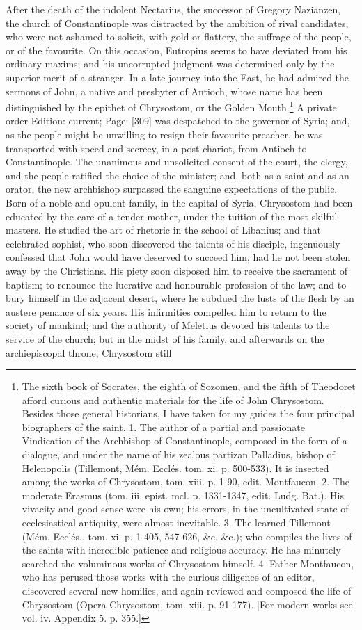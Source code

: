 After the death of the indolent Nectarius, the successor of Gregory Nazianzen, the church of Constantinople was distracted by the ambition of rival candidates, who were not ashamed to solicit, with gold or flattery, the suffrage of the people, or of the favourite. On this occasion, Eutropius seems to have deviated from his ordinary maxims; and his uncorrupted judgment was determined only by the superior merit of a stranger. In a late journey into the East, he had admired the sermons of John, a native and presbyter of Antioch, whose name has been distinguished by the epithet of Chrysostom, or the Golden Mouth.\footnote{The sixth book of Socrates, the eighth of Sozomen, and the fifth of Theodoret afford curious and authentic materials for the life of John Chrysostom. Besides those general historians, I have taken for my guides the four principal biographers of the saint. 1. The author of a partial and passionate Vindication of the Archbishop of Constantinople, composed in the form of a dialogue, and under the name of his zealous partizan Palladius, bishop of Helenopolis (Tillemont, Mém. Ecclés. tom. xi. p. 500-533). It is inserted among the works of Chrysostom, tom. xiii. p. 1-90, edit. Montfaucon. 2. The moderate Erasmus (tom. iii. epist. mcl. p. 1331-1347, edit. Ludg. Bat.). His vivacity and good sense were his own; his errors, in the uncultivated state of ecclesiastical antiquity, were almost inevitable. 3. The learned Tillemont (Mém. Ecclés., tom. xi. p. 1-405, 547-626, \&c. \&c.); who compiles the lives of the saints with incredible patience and religious accuracy. He has minutely searched the voluminous works of Chrysostom himself. 4. Father Montfaucon, who has perused those works with the curious diligence of an editor, discovered several new homilies, and again reviewed and composed the life of Chrysostom (Opera Chrysostom, tom. xiii. p. 91-177). [For modern works see vol. iv. Appendix 5. p. 355.]} A private order Edition: current; Page: [309] was despatched to the governor of Syria; and, as the people might be unwilling to resign their favourite preacher, he was transported with speed and secrecy, in a post-chariot, from Antioch to Constantinople. The unanimous and unsolicited consent of the court, the clergy, and the people ratified the choice of the minister; and, both as a saint and as an orator, the new archbishop surpassed the sanguine expectations of the public. Born of a noble and opulent family, in the capital of Syria, Chrysostom had been educated by the care of a tender mother, under the tuition of the most skilful masters. He studied the art of rhetoric in the school of Libanius; and that celebrated sophist, who soon discovered the talents of his disciple, ingenuously confessed that John would have deserved to succeed him, had he not been stolen away by the Christians. His piety soon disposed him to receive the sacrament of baptism; to renounce the lucrative and honourable profession of the law; and to bury himself in the adjacent desert, where he subdued the lusts of the flesh by an austere penance of six years. His infirmities compelled him to return to the society of mankind; and the authority of Meletius devoted his talents to the service of the church; but in the midst of his family, and afterwards on the archiepiscopal throne, Chrysostom still 